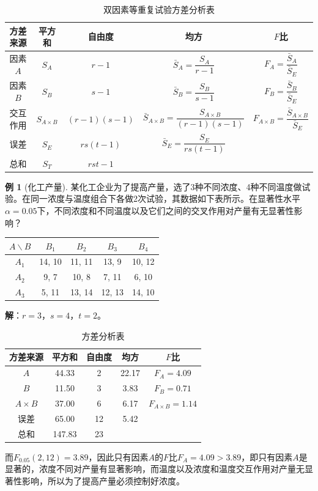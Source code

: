 \documentclass[11pt,a4paper]{report}
\theoremstyle{definition}
\newtheorem{example}{例}[chapter]
\begin{document}
\begin{table}[htbp]
\centering
\caption{双因素等重复试验方差分析表}
\begin{tabular}{@{}ccccc@{}}
\toprule
\textbf{方差来源} & \textbf{平方和} & \textbf{自由度} & \textbf{均方} & \textbf{$F$比} \\
\midrule
因素$A$ & $S_{A}$ & $r-1$ & $\bar{S}_{A}=\dfrac{S_{A}}{r-1}$ & $F_{A}=\dfrac{\bar{S}_{A}}{\bar{S}_{E}}$ \\[0.8em]
因素$B$ & $S_{B}$ & $s-1$ & $\bar{S}_{B}=\dfrac{S_{B}}{s-1}$ & $F_{B}=\dfrac{\bar{S}_{B}}{\bar{S}_{E}}$ \\[0.8em]
交互作用 & $S_{A\times B}$ & $(r-1)(s-1)$ & $\bar{S}_{A\times B}=\dfrac{S_{A\times B}}{(r-1)(s-1)}$ & $F_{A\times B}=\dfrac{\bar{S}_{A\times B}}{\bar{S}_{E}}$ \\[0.8em]
误差 & $S_{E}$ & $rs(t-1)$ & $\bar{S}_{E}=\dfrac{S_{E}}{rs(t-1)}$ & \\[0.8em]
总和 & $S_{T}$ & $rst-1$ & & \\
\bottomrule
\end{tabular}
\end{table}

\begin{example}[化工产量]
某化工企业为了提高产量，选了3种不同浓度、4种不同温度做试验。在同一浓度与温度组合下各做2次试验，其数据如下表所示。在显著性水平$\alpha=0.05$下，不同浓度和不同温度以及它们之间的交叉作用对产量有无显著性影响？

\begin{table}[htbp]
\centering
\begin{tabular}{@{}ccccc@{}}
\toprule
$A\backslash B$ & $B_{1}$ & $B_{2}$ & $B_{3}$ & $B_{4}$ \\
\midrule
$A_{1}$ & 14, 10 & 11, 11 & 13, 9 & 10, 12 \\
$A_{2}$ & 9, 7 & 10, 8 & 7, 11 & 6, 10 \\
$A_{3}$ & 5, 11 & 13, 14 & 12, 13 & 14, 10 \\
\bottomrule
\end{tabular}
\end{table}

\textbf{解}：$r=3$，$s=4$，$t=2$。

\begin{table}[htbp]
\centering
\caption{方差分析表}
\begin{tabular}{@{}ccccc@{}}
\toprule
方差来源 & 平方和 & 自由度 & 均方 & $F$比 \\
\midrule
$A$ & 44.33 & 2 & 22.17 & $F_{A}=4.09$ \\
$B$ & 11.50 & 3 & 3.83 & $F_{B}=0.71$ \\
$A\times B$ & 37.00 & 6 & 6.17 & $F_{A\times B}=1.14$ \\
误差 & 65.00 & 12 & 5.42 & \\
总和 & 147.83 & 23 & & \\
\bottomrule
\end{tabular}
\end{table}

而$F_{0.05}(2,12)=3.89$，因此只有因素$A$的$F$比$F_{A}=4.09>3.89$，即只有因素$A$是显著的，浓度不同对产量有显著影响，而温度以及浓度和温度交互作用对产量无显著性影响，所以为了提高产量必须控制好浓度。
\end{example}
\end{document}
